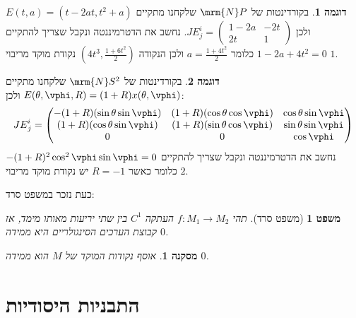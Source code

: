 \documentclass{article}
\newtheorem{corollary}{מסקנה}
\newtheorem*{theorem*}{משפט}
\theoremstyle{definition}
\newtheorem*{example*}{דוגמה}
\begin{document}
	\begin{example*}
		בקורדינטות של
		\(\mrm{N} P\)
		שלקחנו מתקיים
		\(
			E(t,a) = (t-2at,t^2+a)
		\)
		ולכן
		\(
			{JE}^i_j = \begin{pmatrix}
				1-2a & -2t
				\\
				2t & 1
			\end{pmatrix}
		\).
		נחשב את הדטרמיננטה ונקבל שצריך להתקיים
		\(1-2a+4t^2=0\)
		כלומר
		\(a=\frac{1+4t^2}{2}\)
		ולכן הנקודה
		\(\left(4t^3,\frac{1+6t^2}{2}\right)\)
		נקודת מוקד מריבוי \(1\).
	\end{example*}

	\begin{example*}
		בקורדינטות של
		\(\mrm{N} S^2\)
		שלקחנו מתקיים
		\(
		E(\theta,\vphi,R) = (1+R)x(\theta,\vphi)
		\)
		ולכן:
		\[
			{JE}^i_j = \begin{pmatrix}
				-(1+R)(\sin\theta \sin\vphi) & (1+R)(\cos\theta \cos\vphi) & \cos\theta \sin\vphi
				\\
				(1+R)(\cos\theta \sin\vphi) & (1+R)(\sin\theta \cos\vphi) & \sin\theta \sin\vphi
				\\
				0 & 0 & \cos \vphi
			\end{pmatrix}
		\]
		נחשב את הדטרמיננטה ונקבל שצריך להתקיים
		\(-(1+R)^2 \cos^2\vphi \sin\vphi=0\)
		כלומר כאשר
		\(R=-1\)
		יש נקודת מוקד מריבוי \(2\).
	\end{example*}

	כעת נזכר במשפט סרד:
	\begin{theorem*}[משפט סרד]
		תהי
		\(f:M_1\to M_2\)
		העתקה
		\(C^1\)
		בין שתי יריעות מאותו מימד,
		אז קבוצת הערכים הסינגולריים היא ממידה \(0\).
	\end{theorem*}

	\begin{corollary}
		אוסף נקודות המוקד של \(M\) הוא ממידה \(0\).
	\end{corollary}


	\section{התבניות היסודיות}
	
\end{document}
